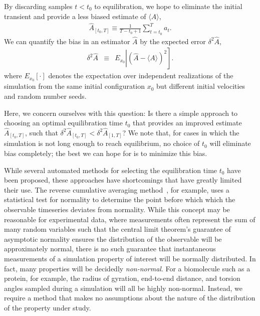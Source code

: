\documentclass[aps,pre,twocolumn,nofootinbib,superscriptaddress,linenumbers,11point]{revtex4-1}
\newcommand{\expect}[1]{\langle #1 \rangle}                %
\begin{document}
By discarding samples $t < t_0$ to equilibration, we hope to eliminate the initial transient and provide a less biased estimate of $\expect{A}$,
\begin{eqnarray}
\hat{A}_{[t_0,T]} \equiv \frac{1}{T-t_0+1} \sum_{t=t_0}^T a_t . \label{equation:production-time-average} 
\end{eqnarray}
We can quantify the bias in an estimator $\hat{A}$ by the expected error $\delta^2 \hat{A}$,
\begin{eqnarray}
\delta^2 \hat{A} &\equiv& E_{x_0} \left| \left( \hat{A} - \expect{A} \right)^2 \right] . \label{equation:rms-error} 
\end{eqnarray}
where $E_{x_0}[\cdot]$ denotes the expectation over independent realizations of the simulation from the same initial configuration $x_0$ but different initial velocities and random number seeds.

Here, we concern ourselves with this question: 
Is there a simple approach to choosing an optimal equilibration time $t_0$ that provides an improved estimate $\hat{A}_{[t_0,T]}$, such that $\delta^2 \hat{A}_{[t_0,T]} < \delta^2 \hat{A}_{[1,T]}$?
We note that, for cases in which the simulation is not long enough to reach equilibrium, no choice of $t_0$ will eliminate bias completely; the best we can hope for is to minimize this bias.

While several automated methods for selecting the equilibration time $t_0$ have been proposed, these approaches have shortcomings that have greatly limited their use.
The reverse cumulative averaging method~\cite{yang-karplus:2004:jcp:reverse-cumulative-averaging}, for example, uses a statistical test for normality to determine the point before which which the observable timeseries deviates from normality.
While this concept may be reasonable for experimental data, where measurements often represent the sum of many random variables such that the central limit theorem's guarantee of asymptotic normality ensures the distribution of the observable will be approximately normal, there is no such guarantee that instantaneous measurements of a simulation property of interest will be normally distributed.
In fact, many properties will be decidedly \emph{non-normal}.
For a biomolecule such as a protein, for example, the radius of gyration, end-to-end distance, and torsion angles sampled during a simulation will all be highly non-normal.
Instead, we require a method that makes no assumptions about the nature of the distribution of the property under study.
\end{document}
